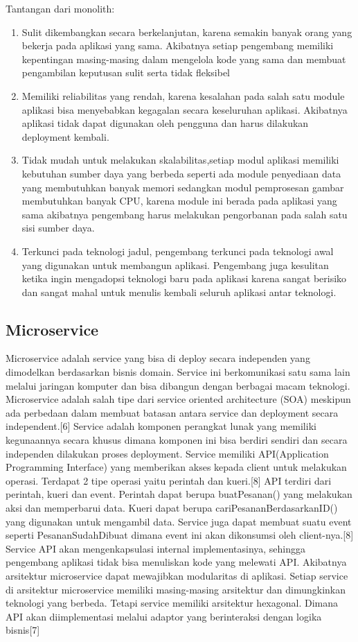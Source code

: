 Tantangan dari monolith:
\begin{enumerate}[leftmargin=1.3cm]
	\item Sulit dikembangkan secara berkelanjutan, karena semakin banyak orang yang bekerja pada aplikasi yang sama. Akibatnya setiap pengembang memiliki kepentingan masing-masing dalam mengelola kode yang sama dan membuat pengambilan keputusan sulit serta tidak fleksibel
	\item Memiliki reliabilitas yang rendah, karena kesalahan pada salah satu module aplikasi bisa menyebabkan kegagalan secara keseluruhan aplikasi. Akibatnya aplikasi tidak dapat digunakan oleh pengguna dan harus dilakukan deployment kembali.
	\item Tidak mudah untuk melakukan skalabilitas,setiap modul aplikasi memiliki kebutuhan sumber daya yang berbeda seperti ada module penyediaan data yang membutuhkan banyak memori sedangkan modul pemprosesan gambar membutuhkan banyak CPU, karena module ini berada pada aplikasi yang sama akibatnya pengembang harus melakukan pengorbanan pada salah satu sisi sumber daya.
	\item Terkunci pada teknologi jadul, pengembang terkunci pada teknologi awal yang digunakan untuk membangun aplikasi. Pengembang juga kesulitan ketika ingin mengadopsi teknologi baru pada aplikasi karena sangat berisiko dan sangat mahal untuk menulis kembali seluruh aplikasi antar teknologi.\\
\end{enumerate}	

\subsection{Microservice}
Microservice adalah service yang bisa di deploy secara independen yang dimodelkan berdasarkan bisnis domain. Service ini berkomunikasi satu sama lain melalui jaringan komputer dan bisa dibangun dengan berbagai macam teknologi.  Microservice adalah salah tipe dari service oriented architecture (SOA) meskipun ada perbedaan dalam membuat batasan antara service dan deployment  secara independent.[6]
Service adalah komponen perangkat lunak yang memiliki kegunaannya secara khusus dimana komponen ini bisa berdiri sendiri dan secara independen dilakukan proses deployment. Service memiliki API(Application Programming Interface) yang memberikan akses kepada client untuk melakukan operasi. Terdapat 2 tipe operasi yaitu perintah dan kueri.[8]
API terdiri dari perintah, kueri dan event. Perintah dapat berupa buatPesanan() yang melakukan aksi dan memperbarui data. Kueri dapat berupa cariPesananBerdasarkanID() yang digunakan untuk mengambil data. Service juga dapat membuat suatu event seperti PesananSudahDibuat dimana event ini akan dikonsumsi oleh client-nya.[8]
Service API akan mengenkapsulasi internal implementasinya, sehingga pengembang aplikasi tidak bisa menuliskan kode yang melewati API. Akibatnya arsitektur microservice dapat mewajibkan modularitas di aplikasi.  Setiap service di arsitektur microservice memiliki masing-masing arsitektur dan dimungkinkan teknologi  yang berbeda. Tetapi service memiliki arsitektur hexagonal. Dimana API akan diimplementasi melalui adaptor yang berinteraksi dengan logika bisnis[7]

